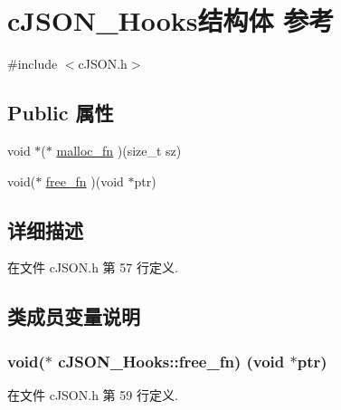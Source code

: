 \hypertarget{structc_j_s_o_n___hooks}{}\section{c\+J\+S\+O\+N\+\_\+\+Hooks结构体 参考}
\label{structc_j_s_o_n___hooks}


{\ttfamily \#include $<$c\+J\+S\+O\+N.\+h$>$}

\subsection*{Public 属性}
\begin{DoxyCompactItemize}
\item 
void $\ast$($\ast$ \hyperlink{structc_j_s_o_n___hooks_a7f7cfcc2ea2d783405e6f4f6eab99ec7}{malloc\+\_\+fn} )(size\+\_\+t sz)
\item 
void($\ast$ \hyperlink{structc_j_s_o_n___hooks_a53e4e91f1e224c1e78c5d1fff7039372}{free\+\_\+fn} )(void $\ast$ptr)
\end{DoxyCompactItemize}


\subsection{详细描述}


在文件 c\+J\+S\+O\+N.\+h 第 57 行定义.



\subsection{类成员变量说明}
\hypertarget{structc_j_s_o_n___hooks_a53e4e91f1e224c1e78c5d1fff7039372}{}
\subsubsection[{free\+\_\+fn}]{\setlength{\rightskip}{0pt plus 5cm}void($\ast$ c\+J\+S\+O\+N\+\_\+\+Hooks\+::free\+\_\+fn) (void $\ast$ptr)}\label{structc_j_s_o_n___hooks_a53e4e91f1e224c1e78c5d1fff7039372}


在文件 c\+J\+S\+O\+N.\+h 第 59 行定义.

\hypertarget{structc_j_s_o_n___hooks_a7f7cfcc2ea2d783405e6f4f6eab99ec7}{}
